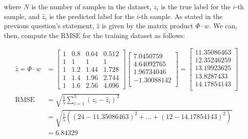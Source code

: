 \documentclass[12pt]{article}
\begin{document}
\begin{enumerate}[leftmargin=\labelsep]
        where $N$ is the number of samples in the dataset, $z_i$ is the true label for
        the $i$-th sample, and $\hat{z}_i$ is the predicted label for the $i$-th sample.
        As stated in the previous question's statement, $\hat{z}$ is given by the matrix product
        $\Phi \cdot w$. We can, then, compute the RMSE for the training dataset as follows:

        \begin{equation*}
          \begin{aligned}
            \hat{z} = \Phi \cdot w & = \begin{bmatrix}
                                         1 & 0.8 & 0.64 & 0.512 \\
                                         1 & 1   & 1    & 1     \\
                                         1 & 1.2 & 1.44 & 1.728 \\
                                         1 & 1.4 & 1.96 & 2.744 \\
                                         1 & 1.6 & 2.56 & 4.096
                                       \end{bmatrix}
            \begin{bmatrix}
              7.0450759   \\
              4.64092765  \\
              1.96734046  \\
              -1.30088142 \\
            \end{bmatrix} = \begin{bmatrix}
                              11.35086463 \\
                              12.35246259 \\
                              13.19923625 \\
                              13.8287433  \\
                              14.17854143 \\
                            \end{bmatrix}                                                                                    \\
            \text{RMSE}            & = \sqrt{\frac{1}{5} \sum_{i=1}^5 (z_i - \hat{z}_i)^2}                                    \\
                                   & = \sqrt{\frac{1}{5} \left( (24 - 11.35086463)^2 + \hdots + (12 - 14.17854143)^2 \right)} \\
                                   & = 6.84329
          \end{aligned}
        \end{equation*}


\end{enumerate}
\end{document}
